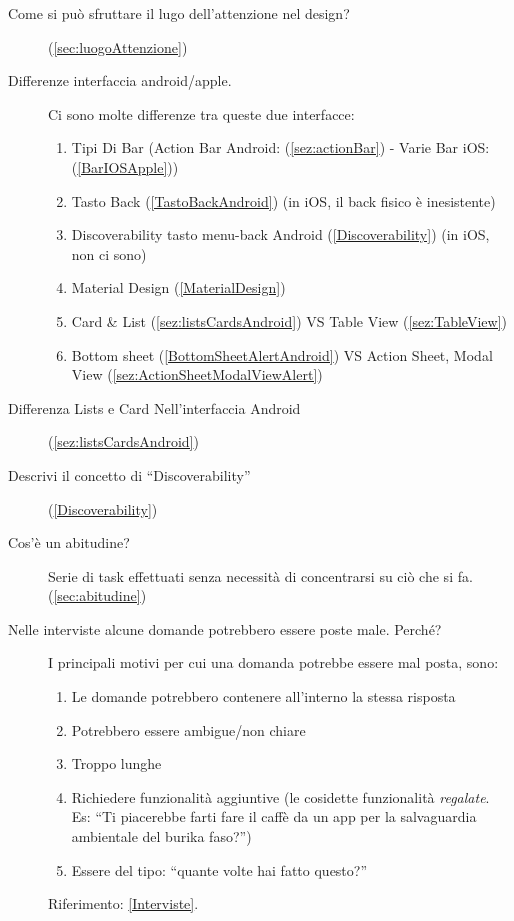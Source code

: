 \documentclass[oneside]{book}
\begin{document}
\begin{description}
	\item[Come si può sfruttare il lugo dell'attenzione nel design?] (\ref{sec:luogoAttenzione})
	\item[Differenze interfaccia android/apple.] Ci sono molte differenze tra queste due interfacce:
		\begin{enumerate}
		\item Tipi Di Bar (Action Bar Android: (\ref{sez:actionBar}) - Varie Bar iOS: (\ref{BarIOSApple}))
		\item Tasto Back (\ref{TastoBackAndroid}) (in iOS, il back fisico è inesistente)
		\item Discoverability tasto menu-back Android (\ref{Discoverability}) (in iOS, non ci sono)
		\item Material Design (\ref{MaterialDesign})
		\item Card \& List (\ref{sez:listsCardsAndroid}) VS Table View (\ref{sez:TableView})
		\item Bottom sheet (\ref{BottomSheetAlertAndroid}) VS Action Sheet, Modal View (\ref{sez:ActionSheetModalViewAlert})
		\end{enumerate}
	\item[Differenza Lists e Card Nell'interfaccia Android] (\ref{sez:listsCardsAndroid})
	\item[Descrivi il concetto di ``Discoverability''] (\ref{Discoverability})
	\item[Cos'è un abitudine?] Serie di task effettuati senza necessità di concentrarsi su ciò che si fa. (\ref{sec:abitudine})
	\item[Nelle interviste alcune domande potrebbero essere poste male. Perché?] 
		I principali motivi per cui una domanda potrebbe essere mal posta, sono:
		\begin{enumerate}
			\item Le domande potrebbero contenere all'interno la stessa risposta
			\item Potrebbero essere ambigue/non chiare
			\item Troppo lunghe
			\item Richiedere funzionalità aggiuntive (le cosidette funzionalità \emph{regalate}. Es: ``Ti piacerebbe farti fare il caffè da un app per la salvaguardia ambientale del burika faso?'')
			\item Essere del tipo: ``quante volte hai fatto questo?''
		\end{enumerate}
		Riferimento: \ref{Interviste}.
	\end{description}
\end{document}

